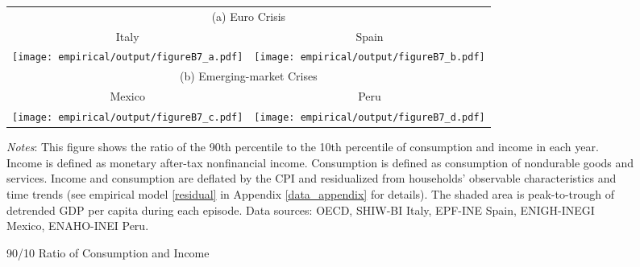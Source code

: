 \documentclass[12pt]{article}
\begin{document}
\begin{spacing}{1.5}
\begin{figure}[H]
	\begin{tabular}{cc}
		\multicolumn{2}{c}{(a) Euro Crisis} \vspace{.4em}  \\
		{\small{}{Italy} } & {\small{}{Spain} } \tabularnewline
		\texttt{[image: empirical/output/figureB7\_a.pdf]} &
		\texttt{[image: empirical/output/figureB7\_b.pdf]} \\
		\multicolumn{2}{c}{(b) Emerging-market Crises} \vspace{.4em} \\
		{\small{}{Mexico} } & {\small{}{Peru} }\tabularnewline
		\texttt{[image: empirical/output/figureB7\_c.pdf]} &
		\texttt{[image: empirical/output/figureB7\_d.pdf]} \\
	\end{tabular}\caption{90/10 Ratio of Consumption and Income
		\label{fig_9010_CY}}
	\medskip{}
	\raggedright{}\textit{\footnotesize{}Notes}{\footnotesize{}: This figure shows the ratio of the 90th percentile to the 10th percentile of consumption and income in each year. Income is defined as monetary after-tax nonfinancial income. Consumption is defined as consumption of nondurable goods and services.  Income and consumption are deflated by the CPI and residualized from households' observable characteristics and time trends (see empirical model \eqref{residual} in Appendix \ref{data_appendix} for details). The shaded area is peak-to-trough of detrended GDP per capita during each episode. Data sources: OECD, SHIW-BI Italy, EPF-INE Spain, ENIGH-INEGI Mexico, ENAHO-INEI Peru.}{\footnotesize\par}
\end{figure}


\end{spacing}
\end{document}
